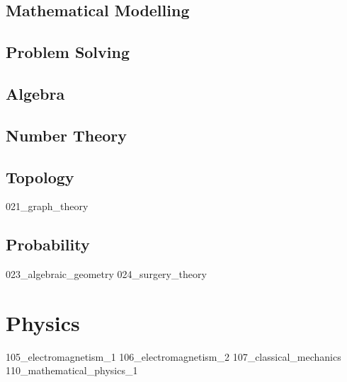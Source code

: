 \documentclass[crop=false,class=book,oneside]{standalone}
\begin{document}
\chapter{Mathematical Modelling}
\chapter{Problem Solving}
\chapter{Algebra}
\chapter{Number Theory}
\chapter{Topology}
{021_graph_theory}
\chapter{Probability}
{023_algebraic_geometry}
{024_surgery_theory}
\part{Physics}
{105_electromagnetism_1}
{106_electromagnetism_2}
{107_classical_mechanics}
{110_mathematical_physics_1}
\end{document}

